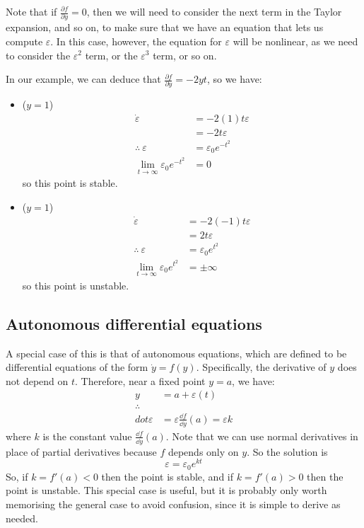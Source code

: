 Note that if \(\frac{\partial f}{\partial y} = 0\), then we will need to consider the next term in the Taylor expansion, and so on, to make sure that we have an equation that lets us compute \(\varepsilon\).
In this case, however, the equation for \(\varepsilon\) will be nonlinear, as we need to consider the \(\varepsilon^2\) term, or the \(\varepsilon^3\) term, or so on.

In our example, we can deduce that \(\frac{\partial f}{\partial y} = -2yt\), so we have:
\begin{itemize}
	\item (\(y = 1\)) \begin{align*}
		      \dot \varepsilon                           & = -2(1)t \varepsilon     \\
		                                                 & = -2t\varepsilon         \\
		      \therefore\ \varepsilon                     & = \varepsilon_0 e^{-t^2} \\
		      \lim_{t \to \infty} \varepsilon_0 e^{-t^2} & = 0
	      \end{align*}
	      so this point is stable.
	\item (\(y = 1\)) \begin{align*}
		      \dot \varepsilon                          & = -2(-1)t \varepsilon   \\
		                                                & = 2t\varepsilon         \\
		      \therefore\ \varepsilon                    & = \varepsilon_0 e^{t^2} \\
		      \lim_{t \to \infty} \varepsilon_0 e^{t^2} & = \pm\infty
	      \end{align*}
	      so this point is unstable.
\end{itemize}

\subsection{Autonomous differential equations}
A special case of this is that of autonomous equations, which are defined to be differential equations of the form \(\dot y = f(y)\).
Specifically, the derivative of \(y\) does not depend on \(t\).
Therefore, near a fixed point \(y=a\), we have:
\begin{align*}
	y                         & = a + \varepsilon(t)                                   \\
	\therefore\\dot\varepsilon & = \varepsilon \frac{\dd{f}}{\dd{y}}(a) = \varepsilon k
\end{align*}
where \(k\) is the constant value \(\frac{\dd{f}}{\dd{y}}(a)\).
Note that we can use normal derivatives in place of partial derivatives because \(f\) depends only on \(y\).
So the solution is
\[
	\varepsilon = \varepsilon_0 e^{kt}
\]
So, if \(k = f'(a) < 0\) then the point is stable, and if \(k = f'(a) > 0\) then the point is unstable.
This special case is useful, but it is probably only worth memorising the general case to avoid confusion, since it is simple to derive as needed.
